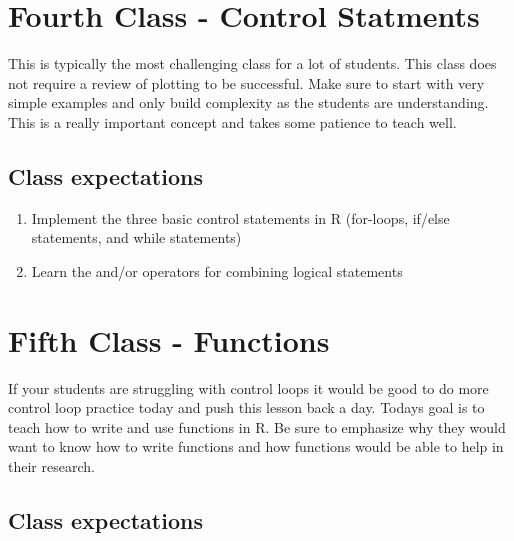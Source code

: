 \documentclass[paper=a4, fontsize=11pt]{scrartcl} %
\numberwithin{equation}{section} %
\numberwithin{figure}{section} %
\numberwithin{table}{section} %
\begin{document}

\section{Fourth Class - Control Statments}

This is typically the most challenging class for a lot of students. This class does not require a review of plotting to be successful. Make sure to start with very simple examples and only build complexity as the students are understanding. This is a really important concept and takes some patience to teach well.  


\subsection{Class expectations}

\begin{enumerate}
\item Implement the three basic control statements in R (for-loops, if/else statements, and while statements)
\item Learn the and/or operators for combining logical statements
\end{enumerate}


\section{Fifth Class - Functions}

If your students are struggling with control loops it would be good to do more control loop practice today and push this lesson back a day. Todays goal is to teach how to write and use functions in R. Be sure to emphasize why they would want to know how to write functions and how functions would be able to help in their research. 


\subsection{Class expectations}
\end{document}
